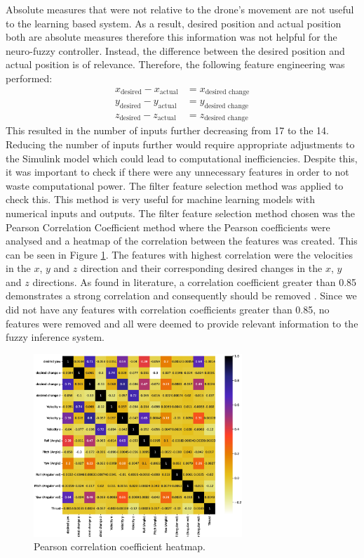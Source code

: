 Absolute measures that were not relative to the drone's movement are not useful to the learning based system. As a result, desired position and actual position both are absolute measures therefore this information was not helpful for the neuro-fuzzy controller. Instead, the difference between the desired position and actual position is of relevance. Therefore, the following feature engineering was performed: 
\begin{align}
    x_{\textrm{desired}} - x_{\textrm{actual}} & = x_{\textrm{desired change}}\\
    y_{\textrm{desired}} - y_{\textrm{actual}} & = y_{\textrm{desired change}}\\
    z_{\textrm{desired}} - z_{\textrm{actual}} & = z_{\textrm{desired change}}
\end{align}
This resulted in the number of inputs further decreasing from 17 to the 14. Reducing the number of inputs further would require appropriate adjustments to the Simulink model which could lead to computational inefficiencies. Despite this, it was important to check if there were any unnecessary features in order to not waste computational power. The filter feature selection method was applied to check this. This method is very useful for machine learning models with numerical inputs and outputs. The filter feature selection method chosen was the Pearson Correlation Coefficient method where the Pearson coefficients were analysed and a heatmap of the correlation between the features was created. This can be seen in Figure \ref{fig:zain6}. The features with highest correlation were the velocities in the $x$, $y$ and $z$ direction and their corresponding desired changes in the $x$, $y$ and $z$ directions. As found in literature, a correlation coefficient greater than 0.85 demonstrates a strong correlation and consequently should be removed \cite{654654}. Since we did not have any features with correlation coefficients greater than 0.85, no features were removed and all were deemed to provide relevant information to the fuzzy inference system.
\begin{figure}[H]
    \centering
    \includegraphics[width = 0.7\textwidth]{img/pearson.eps}
    \caption{Pearson correlation coefficient heatmap.}
    \label{fig:zain6}
\end{figure} 
